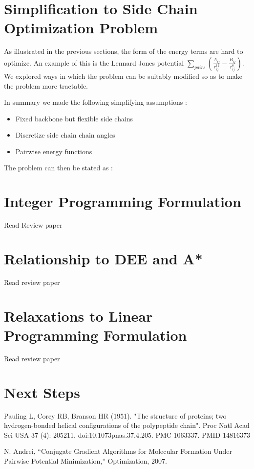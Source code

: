 \documentclass{article} %
\begin{document}
\section{Simplification to Side Chain Optimization Problem}
As illustrated in the previous sections, the form of the energy terms are hard to optimize. An example of this is the Lennard Jones potential $\sum_{pairs} (\frac{A_{ij}}{r^{12}_{ij}}-\frac{B_{ij}}{r^{6}_{ij}})$. We explored ways in which the problem can be suitably modified so as to make the problem more tractable. 

In summary we made the following simplifying assumptions :
\begin{itemize}
\item Fixed backbone but flexible side chains
\item Discretize side chain chain angles 
\item Pairwise energy functions
\end{itemize}

The problem can then be stated as : 





\section{Integer Programming Formulation}
Read Review paper

\section{Relationship to DEE and A*}
Read review paper

\section{Relaxations to Linear Programming Formulation}
Read review paper

\section{Next Steps}


\begin{thebibliography}{99}

Pauling L, Corey RB, Branson HR (1951). "The structure of proteins; 
two hydrogen-bonded helical configurations of the polypeptide chain". Proc Natl Acad Sci USA 37 (4): 205211. 
doi:10.1073\/pnas.37.4.205. PMC 1063337. PMID 14816373

N. Andrei, “Conjugate Gradient Algorithms for Molecular Formation Under
Pairwise Potential Minimization,” Optimization, 2007.


\end{thebibliography}
\end{document}
